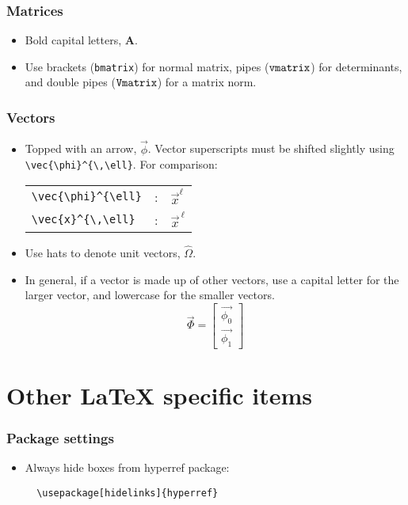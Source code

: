 \documentclass[10pt, letter]{article}
\begin{document}
\begin{multicols}{2}
\subsubsection*{Matrices}
\begin{itemize}
\item Bold capital letters, $\mathbf{A}$.
\item Use brackets (\verb|bmatrix|) for normal matrix, pipes
  ($\verb|vmatrix|$) for
  determinants, and double pipes ($\verb|Vmatrix|$) for a matrix norm.
\end{itemize}

\subsubsection*{Vectors}
\begin{itemize}
\item Topped with an arrow, $\vec{\phi}$. Vector superscripts must be shifted
slightly using \verb|\vec{\phi}^{\,\ell}|. For comparison:
\begin{center}
  \begin{tabular}[h!]{lcl}
    \verb|\vec{\phi}^{\ell}| & : & $\vec{x}^{\ell}$ \\
    \verb|\vec{x}^{\,\ell}| & : & $\vec{x}^{\,\ell}$
  \end{tabular}
\end{center}
\item Use hats to denote unit vectors, $\hat{\Omega}$.
\item In general, if a vector is made up of other vectors, use a
  capital letter for the larger vector, and lowercase for the smaller
  vectors.
\begin{equation*}
    \vec{\Phi} =
    \begin{bmatrix}
      \vec{\phi_0} \\ \vec{\phi_1}
    \end{bmatrix}
\end{equation*}
\end{itemize}
\end{multicols}
\pagebreak

\section{Other \LaTeX{} specific items}\label{sec:latex}

\subsubsection*{Package settings}
\begin{itemize}
\item Always hide boxes from hyperref package:
\begin{lstlisting}
  \usepackage[hidelinks]{hyperref}
\end{lstlisting}
\end{itemize}
\end{document}

